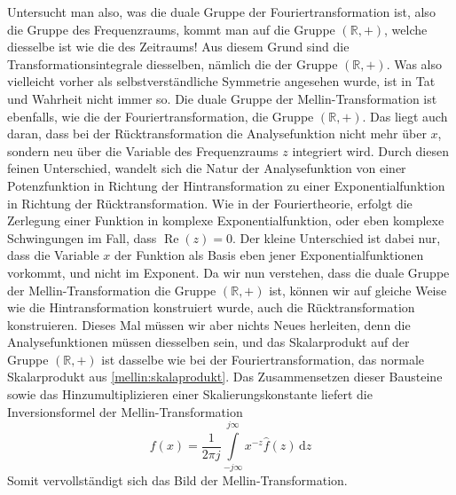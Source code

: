 Untersucht man also, was die duale Gruppe der Fouriertransformation ist, also die Gruppe des Frequenzraums, kommt man auf die 
Gruppe $(\mathbb{R},+)$, welche diesselbe ist wie die des Zeitraums!
Aus diesem Grund sind die Transformationsintegrale diesselben, nämlich die der Gruppe $(\mathbb{R},+)$.
Was also vielleicht vorher als selbstverständliche Symmetrie angesehen wurde, ist in Tat und Wahrheit nicht immer so.
Die duale Gruppe der Mellin-Transformation ist ebenfalls, wie die der Fouriertransformation, die Gruppe $(\mathbb{R},+)$.
Das liegt auch daran, dass bei der Rücktransformation die Analysefunktion nicht mehr über $x$, sondern neu über die Variable des 
Frequenzraums $z$ integriert wird. 
Durch diesen feinen Unterschied, wandelt sich die Natur der Analysefunktion von einer Potenzfunktion in Richtung der Hintransformation zu 
einer Exponentialfunktion in Richtung der Rücktransformation.
Wie in der Fouriertheorie, erfolgt die Zerlegung einer Funktion in komplexe Exponentialfunktion, oder eben komplexe Schwingungen im Fall, 
dass $\operatorname{Re}(z) = 0$.
Der kleine Unterschied ist dabei nur, dass die Variable $x$ der Funktion als Basis eben jener Exponentialfunktionen vorkommt, und nicht 
im Exponent.
Da wir nun verstehen, dass die duale Gruppe der Mellin-Transformation die Gruppe $(\mathbb{R},+)$ ist, können wir auf gleiche Weise wie 
die Hintransformation konstruiert wurde, auch die Rücktransformation konstruieren.
Dieses Mal müssen wir aber nichts Neues herleiten, denn die Analysefunktionen müssen diesselben sein, und das Skalarprodukt auf der 
Gruppe $(\mathbb{R},+)$ ist dasselbe wie bei der Fouriertransformation, das normale Skalarprodukt aus \eqref{mellin:skalaprodukt}. 
Das Zusammensetzen dieser Bausteine sowie das Hinzumultiplizieren einer Skalierungskonstante liefert die Inversionsformel der 
Mellin-Transformation
\begin{equation}
    f(x) = \frac{1}{2\pi j} \int\limits_{-j\infty}^{j\infty} x^{-z} \hat{f}(z) \,\mathrm{d}z
    \label{mellin:mellininv}
\end{equation}
Somit vervollständigt sich das Bild der Mellin-Transformation.




